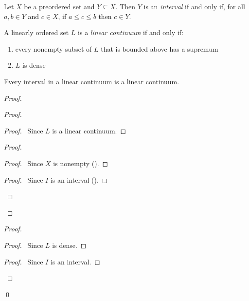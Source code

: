 \begin{definition}[Interval]
    Let $X$ be a preordered set and $Y \subseteq X$. Then $Y$ is an \emph{interval} if and only if, for
    all $a, b \in Y$ and $c \in X$, if $a \leq c \leq b$ then $c \in Y$.
\end{definition}

\begin{definition}
    A linearly ordered set $L$ is a \emph{linear continuum} if and only if:
    \begin{enumerate}
        \item every nonempty subset of $L$ that is bounded above has a supremum
        \item $L$ is dense
    \end{enumerate}
\end{definition}

\begin{proposition}
    Every interval in a linear continuum is a linear continuum.
\end{proposition}

\begin{proof}
    \pf
    \begin{proof}
        \begin{proof}
            \pf\ Since $L$ is a linear continuum.
        \end{proof}
        \begin{proof}
            \begin{proof}
                \pf\ Since $X$ is nonempty ().
            \end{proof}
            \begin{proof}
                \pf\ Since $I$ is an interval ().
            \end{proof}
        \end{proof}
    \end{proof}
    \begin{proof}
        \begin{proof}
            \pf\ Since $L$ is dense.
        \end{proof}
        \begin{proof}
            \pf\ Since $I$ is an interval.
        \end{proof}
    \end{proof}
    \qed
\end{proof}

